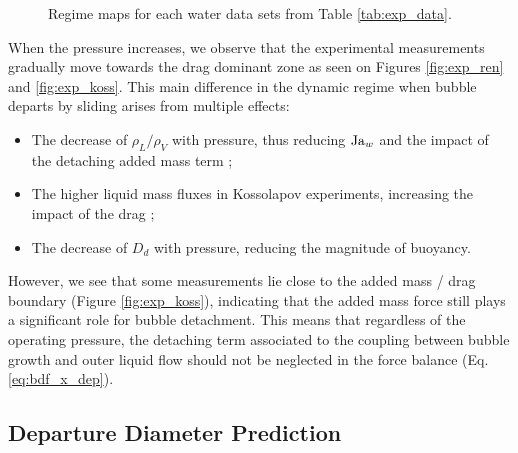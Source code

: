 \begin{figure}[h!]
\begin{center}
{\label{fig:exp_ren}
} 


	\caption{Regime maps for each water data sets from Table \ref{tab:exp_data}.}	
	\label{fig:exp_maps}
\end{center}
\end{figure}

\npar


When the pressure increases, we observe that the experimental measurements gradually move towards the drag dominant zone as seen on Figures \ref{fig:exp_ren} and \ref{fig:exp_koss}. This main difference in the dynamic regime when bubble departs by sliding arises from multiple effects:

\begin{itemize}
\item The decrease of $\rho_{L}/\rho_{V}$ with pressure, thus reducing $\mathrm{Ja}_{w}$ and the impact of the detaching added mass term ;
\item The higher liquid mass fluxes in Kossolapov experiments, increasing the impact of the drag ;
\item The decrease of $D_{d}$ with pressure, reducing the magnitude of buoyancy.
\end{itemize}

However, we see that some measurements lie close to the added mass / drag boundary (Figure \ref{fig:exp_koss}), indicating that the added mass force still plays a significant role for bubble detachment. This means that regardless of the operating pressure, the detaching term associated to the coupling between bubble growth and outer liquid flow should not be neglected in the force balance (Eq. \ref{eq:bdf_x_dep}).




\subsection{Departure Diameter Prediction}\label{subsec:Dd_pred}

